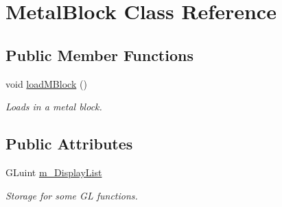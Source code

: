 \hypertarget{classMetalBlock}{\section{Metal\-Block Class Reference}
\label{classMetalBlock}
}
\subsection*{Public Member Functions}
\begin{DoxyCompactItemize}
\item 
\hypertarget{classMetalBlock_a16b6e312e176a9412206a3a67f429910}{void \hyperlink{classMetalBlock_a16b6e312e176a9412206a3a67f429910}{load\-M\-Block} ()}\label{classMetalBlock_a16b6e312e176a9412206a3a67f429910}

\begin{DoxyCompactList}\small\item\em Loads in a metal block. \end{DoxyCompactList}\end{DoxyCompactItemize}
\subsection*{Public Attributes}
\begin{DoxyCompactItemize}
\item 
\hypertarget{classMetalBlock_a6fb8a843a9435d6db7a595d10af35eab}{G\-Luint \hyperlink{classMetalBlock_a6fb8a843a9435d6db7a595d10af35eab}{m\-\_\-\-Display\-List}}\label{classMetalBlock_a6fb8a843a9435d6db7a595d10af35eab}

\begin{DoxyCompactList}\small\item\em Storage for some G\-L functions. \end{DoxyCompactList}\end{DoxyCompactItemize}
